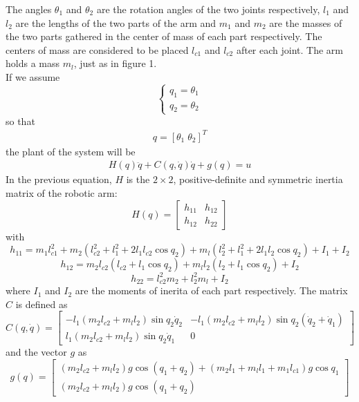 \documentclass[a4paper]{article}
\newcommand\dotq{\dot{q}}
\newcommand\ddotq{\ddot{q}}
\begin{document}
\noindent\hspace{-2pt}
The angles $\theta_1$ and $\theta_2$ are the rotation angles of the two joints respectively, $l_1$ and $l_2$ are the 
lengths of the two parts of the arm and $m_1$ and $m_2$ are the masses of the two parts gathered in the center of mass of 
each part respectively. The centers of mass are considered to be placed $l_{c1}$ and $l_{c2}$ after each joint. The arm 
holds a mass $m_l$, just as in figure 1. \\
If we assume 
$$
    \begin{cases}
        q_1 = \theta_1 \\ 
        q_2 = \theta_2
    \end{cases}
$$
so that 
\begin{align}
    q = [\theta_1 \; \theta_2]^T
\end{align}
the plant of the system will be 
\begin{align}
    H(q) \ddotq + C(q, \dotq) \dotq + g(q) = u
\end{align}
In the previous equation, $H$ is the $2 \times 2$, positive-definite and symmetric inertia matrix of the robotic arm: 
$$
    H(q) =  \begin{bmatrix}
            h_{11} & h_{12} \\
            h_{12} & h_{22}        
            \end{bmatrix}
$$
with 
$$h_{11} = m_{1} l_{c 1}^{2}+m_{2}\left(l_{c 2}^{2}+l_{1}^{2}+2 l_{1} l_{c 2} \cos q_{2}\right)+m_{l}\left(l_{2}^{2}+l_{1}^{2}+2 l_{1} l_{2} \cos q_{2}\right)+I_{1}+I_{2}$$
$$h_{12} = m_{2} l_{c 2}\left(l_{c 2}+l_{1} \cos q_{2}\right)+m_{l} l_{2}\left(l_{2}+l_{1} \cos q_{2}\right)+I_{2}$$
$$h_{22} = l_{c 2}^{2} m_{2}+l_{2}^{2} m_{l}+I_{2}$$
where $I_1$ and $I_2$ are the moments of inerita of each part respectively.
The matrix $C$ is defined as
$$C(q, \dotq) =     \begin{bmatrix}
                        -l_{1}\left(m_{2} l_{c 2}+m_{l} l_{2}\right) \sin q_{2} \dot{q}_{2} & -l_{1}\left(m_{2} l_{c 2}+m_{l} l_{2}\right) \sin q_{2}\left(\dot{q}_{2}+\dot{q}_{1}\right) \\
                        l_{1}\left(m_{2} l_{c 2}+m_{l} l_{2}\right) \sin q_{2} \dot{q}_{1} & 0
                    \end{bmatrix}
$$
and the vector $g$ as 
$$
    g(q) =  \begin{bmatrix}
                \left(m_{2} l_{c 2}+m_{l} l_{2}\right) g \cos \left(q_{1}+q_{2}\right)+\left(m_{2} l_{1}+m_{l} l_{1}+m_{1} l_{c 1}\right) g \cos q_{1} \\
                \left(m_{2} l_{c 2}+m_{l} l_{2}\right) g \cos \left(q_{1}+q_{2}\right)
            \end{bmatrix}
$$ \\
\end{document}
